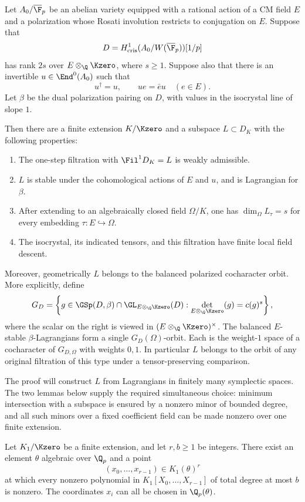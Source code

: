 \begin{theorem}
\label{thm:filtration}
Let $A_0/\overline{\F}_p$ be an abelian variety equipped with a rational
action of a CM field $E$ and a polarization whose Rosati involution
restricts to conjugation on $E$.  Suppose that
\[
 D=H^1_{\mathrm{cris}}(A_0/W(\overline{\F}_p))[1/p]
\]
has rank $2s$ over $E\otimes_\Q\Kzero$, where $s\geq 1$.  Suppose also
that there is an invertible $u\in\End^0(A_0)$ such that
\[
 u^\dagger=u,\qquad ue=\bar e u\quad(e\in E).
\]
Let $\beta$ be the dual polarization pairing on $D$, with values in
the isocrystal line of slope $1$.

Then there are a finite extension $K/\Kzero$ and a subspace $L\subset
D_K$ with the following properties:
\begin{enumerate}
\item The one-step filtration with $\Fil^1D_K=L$ is weakly admissible.
\item $L$ is stable under the cohomological actions of $E$ and $u$,
and is Lagrangian for $\beta$.
\item After extending to an algebraically closed field $\Omega/K$,
one has $\dim_\Omega L_\tau=s$ for every embedding
$\tau:E\hookrightarrow\Omega$.
\item The isocrystal, its indicated tensors, and this filtration have
finite local field descent.
\end{enumerate}
Moreover, geometrically $L$ belongs to the balanced polarized
cocharacter orbit.  More explicitly, define
\[
 G_D=\left\{g\in\GSp(D,\beta)\cap
 \GL_{E\otimes_\Q\Kzero}(D):
 \det_{E\otimes_\Q\Kzero}(g)=c(g)^s\right\},
\]
where the scalar on the right is viewed in
$(E\otimes_\Q\Kzero)^\times$.  The balanced $E$-stable
$\beta$-Lagrangians form a single $G_D(\Omega)$-orbit.  Each is the
weight-$1$ space of a cocharacter of $G_{D,\Omega}$ with weights $0,1$.
In particular $L$ belongs to the orbit of any original filtration of
this type under a tensor-preserving comparison.
\end{theorem}

The proof will construct \(L\) from Lagrangians in finitely many
symplectic spaces. The two lemmas below supply the required simultaneous
choice: minimum intersection with a subspace is ensured by a nonzero
minor of bounded degree, and all such minors over a fixed coefficient
field can be made nonzero over one finite extension.

\begin{lemma}
\label{lem:avoidance}
Let $K_1/\Kzero$ be a finite extension, and let $r,b\geq 1$ be integers.
There exist an element $\theta$ algebraic over $\Q_p$ and a point
\[
 (x_0,\ldots,x_{r-1})\in K_1(\theta)^r
\]
at which every nonzero polynomial in $K_1[X_0,\ldots,X_{r-1}]$ of total
degree at most $b$ is nonzero.  The coordinates $x_i$ can all be chosen
in $\Q_p(\theta)$.
\end{lemma}

